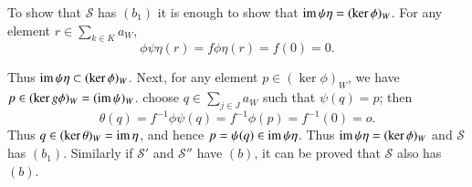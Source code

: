 To show that $\mathscr{S}$ has $(b_1)$ it is enough to show that $\operatorname{im}
\psi \eta = (\ker \phi)_W$. For any element $r \in \sum\limits_{k \in K}
a_W$, 
$$
\phi \psi \eta (r) = f \phi \eta (r) = f(0) = 0. 
$$\pageoriginale

Thus $\operatorname{im} \psi \eta \subset (\ker \phi)_W$. Next, for any element $p
\in (\ker \phi)_W$, we have $p \in (\ker g \phi)_W = (\operatorname{im} \psi
)_W$. choose $q \in \sum\limits_{j \in J} a_W$ such that $\psi (q) =
p$; then 
$$
\theta (q) = f^{-1} \phi \psi (q) = f^{-1} \phi (p) = f^{-1}(0) = o. 
$$
Thus $q \in (\ker \theta)_W = \operatorname{im} \eta$, and hence $p = \psi (q) \in
\operatorname{im} \psi \eta$. Thus $\operatorname{im} \psi \eta = (\ker \phi)_W$ and $\mathscr{S}$
has $(b_1)$. Similarly if $\mathscr{S}'$ and $\mathscr{S}''$ have
$(b)$, it can be proved that $\mathscr{S}$ also has $(b)$. 

